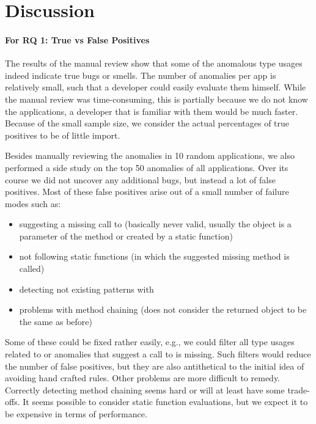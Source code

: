\section{Discussion}\label{sc:disc}

\paragraph{For RQ 1: True vs False Positives}

The results of the manual review show that some of the anomalous type usages indeed indicate true bugs or smells.
The number of anomalies per app is relatively small, such that a developer could easily evaluate them himself.
While the manual review was time-consuming, this is partially because we do not know the applications, a developer that is familiar with them would be much faster.
Because of the small sample size, we consider the actual percentages of true positives to be of little import.

Besides manually reviewing the anomalies in 10 random applications, we also performed a side study on the top 50 anomalies of all applications.
Over its course we did not uncover any additional bugs, but instead a lot of false positives.
Most of these false positives arise out of a small number of failure modes such as:
\begin{itemize}
    \item suggesting a missing call to  (basically never valid, usually the object is a parameter of the method or created by a static function)
    \item not following static functions (in which the suggested missing method is called)
    \item detecting not existing patterns with 
    \item problems with method chaining (does not consider the returned object to be the same as before)
\end{itemize}
Some of these could be fixed rather easily, e.g., we could filter all type usages related to  or anomalies that suggest a call to  is missing.
Such filters would reduce the number of false positives, but they are also antithetical to the initial idea of avoiding hand crafted rules.
Other problems are more difficult to remedy.
Correctly detecting method chaining seems hard or will at least have some trade-offs.
It seems possible to consider static function evaluations, but we expect it to be expensive in terms of performance.

